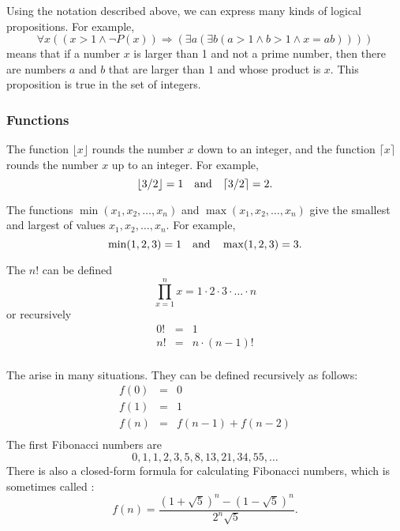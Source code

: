 Using the notation described above,
we can express many kinds of logical propositions.
For example,
\[\forall x ((x>1 \land \lnot P(x)) \Rightarrow (\exists a (\exists b (a > 1 \land b > 1 \land x = ab))))\]
means that if a number $x$ is larger than 1
and not a prime number,
then there are numbers $a$ and $b$
that are larger than $1$ and whose product is $x$.
This proposition is true in the set of integers.

\subsubsection{Functions}

The function $\lfloor x \rfloor$ rounds the number $x$
down to an integer, and the function
$\lceil x \rceil$ rounds the number $x$
up to an integer. For example,
\[ \lfloor 3/2 \rfloor = 1 \hspace{10px} \textrm{and} \hspace{10px} \lceil 3/2 \rceil = 2.\]

The functions $\min(x_1,x_2,\ldots,x_n)$
and $\max(x_1,x_2,\ldots,x_n)$
give the smallest and largest of values
$x_1,x_2,\ldots,x_n$.
For example,
\[ \min(1,2,3)=1 \hspace{10px} \textrm{and} \hspace{10px} \max(1,2,3)=3.\]


The  $n!$ can be defined
\[\prod_{x=1}^n x = 1 \cdot 2 \cdot 3 \cdot \ldots \cdot n\]
or recursively
\[
\begin{array}{lcl}
0! & = & 1 \\
n! & = & n \cdot (n-1)! \\
\end{array}
\]


The 
arise in many situations.
They can be defined recursively as follows:
\[
\begin{array}{lcl}
f(0) & = & 0 \\
f(1) & = & 1 \\
f(n) & = & f(n-1)+f(n-2) \\
\end{array}
\]
The first Fibonacci numbers are
\[0, 1, 1, 2, 3, 5, 8, 13, 21, 34, 55, \ldots\]
There is also a closed-form formula
for calculating Fibonacci numbers, which is sometimes called
 :
\[f(n)=\frac{(1 + \sqrt{5})^n - (1-\sqrt{5})^n}{2^n \sqrt{5}}.\]

